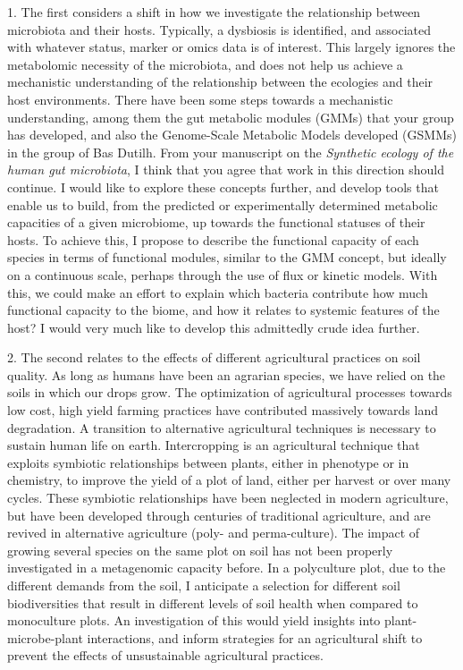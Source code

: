 \documentclass[letterpaper, 10pt]{article} %
\begin{document}
\begin{tcolorbox}[
	blanker,
	width=0.95\textwidth,
	enlarge left by=0.025\textwidth,
	enlarge right by=0.025\textwidth,
	before skip=6pt,
	breakable]
1. The first considers a shift in how we investigate the relationship between microbiota and their hosts. Typically, a dysbiosis is identified, and associated with whatever status, marker or omics data is of interest. This largely ignores the metabolomic necessity of the microbiota, and does not help us achieve a mechanistic understanding of the relationship between the ecologies and their host environments. There have been some steps towards a mechanistic understanding, among them the gut metabolic modules (GMMs) that your group has developed, and also the Genome-Scale Metabolic Models developed (GSMMs) in the group of Bas Dutilh. From your manuscript on the \textit{Synthetic ecology of the human gut microbiota}, I think that you agree that work in this direction should continue. I would like to explore these concepts further, and develop tools that enable us to build, from the predicted or experimentally determined metabolic capacities of a given microbiome, up towards the functional statuses of their hosts. To achieve this, I propose to describe the functional capacity of each species in terms of functional modules, similar to the GMM concept, but ideally on a continuous scale, perhaps through the use of flux or kinetic models. With this, we could make an effort to explain which bacteria contribute how much functional capacity to the biome, and how it relates to systemic features of the host? I would very much like to develop this admittedly crude idea further.

2. The second relates to the effects of different agricultural practices on soil quality. As long as humans have been an agrarian species, we have relied on the soils in which our drops grow. The optimization of agricultural processes towards low cost, high yield farming practices have contributed massively towards land degradation. A transition to alternative agricultural techniques is necessary to sustain human life on earth. Intercropping is an agricultural technique that exploits symbiotic relationships between plants, either in phenotype or in chemistry, to improve the yield of a plot of land, either per harvest or over many cycles. These symbiotic relationships have been neglected in modern agriculture, but have been developed through centuries of traditional agriculture, and are revived in alternative agriculture (poly- and perma-culture). The impact of growing several species on the same plot on soil has not been properly investigated in a metagenomic capacity before. In a polyculture plot, due to the different demands from the soil, I anticipate a selection for different soil biodiversities that result in different levels of soil health when compared to monoculture plots. An investigation of this would yield insights into plant-microbe-plant interactions, and inform strategies for an agricultural shift to prevent the effects of unsustainable agricultural practices.


\end{tcolorbox}
\end{document}
